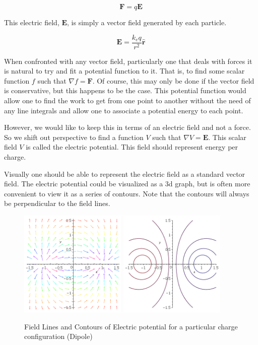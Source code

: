 \documentclass[11pt]{article}
\begin{document}
\begin{equation}
	\mathbf{F} = q \mathbf{E}
\end{equation}

This electric field, \(\mathbf{E}\), is simply a vector field generated by each particle.

\begin{equation}
\mathbf{E} = \frac{k_e q}{r^2} \mathbf{\hat{r}}
\end{equation}

When confronted with any vector field, particularly one that deals with forces it is natural to try and fit a potential function to it.  That is, to find some scalar function \(f\) such that \(\nabla f = \mathbf{F}\). Of course, this may only be done if the vector field is conservative, but this happens to be the case. This potential function would allow one to find the work to get from one point to another without the need of any line integrals and allow one to associate a potential energy to each point.

However, we would like to keep this in terms of an electric field and not a force. So we shift out perspective to find a function \(V\) such that \(\nabla V = \mathbf{E}\). This scalar field \(V\) is called the electric potential.  This field should represent energy per charge.

Visually one should be able to represent the electric field as a standard vector field. The electric potential could be visualized as a 3d graph, but is often more convenient to view it as a series of contours. Note that the contours will always be perpendicular to the field lines.
\begin{figure}[h]
	\begin{center}
	\includegraphics[width=2in]{field}
	\includegraphics[width=2in]{cont}
	\end{center}
	\caption{Field Lines and Contours of Electric potential for a particular charge configuration (Dipole)}
\end{figure}
\end{document}
